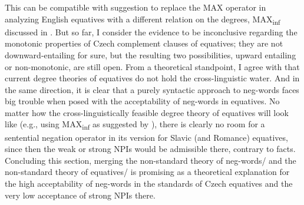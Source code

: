 \documentclass[output=paper,colorlinks,citecolor=brown]{langscibook}
\begin{document}
\noindent This can be compatible with  suggestion to replace the MAX operator in analyzing English equatives with a different relation on the degrees, MAX\textsubscript{inf} discussed in . But so far, I consider the evidence to be inconclusive regarding the monotonic properties of Czech complement clauses of equatives; they are not downward-entailing for sure, but the resulting two possibilities, upward entailing or non-monotonic, are still open. From a theoretical standpoint, I agree with \citet{penka2016degree} that current degree theories of equatives do not hold the cross-linguistic water. And in the same direction, it is clear that a purely syntactic approach to neg-words faces big trouble when posed with the acceptability of neg-words in equatives. No matter how the cross-linguistically feasible degree theory of equatives will look like (e.g., using MAX\textsubscript{inf} as suggested by \cite{penka2016degree}), there is clearly no room for a sentential negation operator in its version for Slavic (and Romance) equatives, since then the weak or strong NPIs would be admissible there, contrary to facts. Concluding this section, merging the non-standard theory of neg-words/\citet{ovalle2004double} and the non-standard theory of equatives/\citet{penka2016degree} is promising as a theoretical explanation for the high acceptability of neg-words in the standards of Czech equatives and the very low acceptance of strong NPIs there.



  
\end{document}
